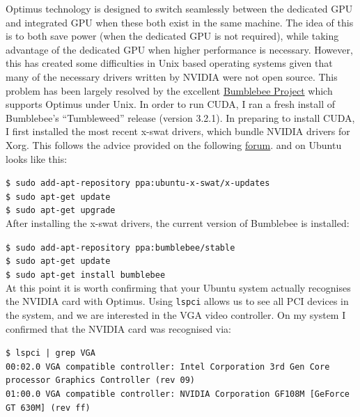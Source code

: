 \documentclass[a4paper,10pt]{article}
\begin{document}
Optimus technology is designed to switch seamlessly between the dedicated GPU
and integrated GPU when these both exist in the same machine.  The idea of this
is to both save power (when the dedicated GPU is not required), while taking
advantage of the dedicated GPU when higher performance is necessary.  However,
this has created some difficulties in Unix based operating systems given that
many of the necessary drivers written by NVIDIA were not open source.  This
problem has been largely resolved by the excellent 
\href{http://bumblebee-project.org/}{Bumblebee Project} which supports Optimus
under Unix.  In order to run CUDA, I ran a fresh install of Bumblebee's 
``Tumbleweed'' release (version 3.2.1).  In preparing to install CUDA, I first
installed the most recent x-swat drivers, which bundle NVIDIA drivers for Xorg.
This follows the advice provided on the following 
\href{http://www.ivegotavirus.com/installing-bumblebee-3-0-tumbleweed-on-ubuntu/}{forum}.
and on Ubuntu looks like this:

\texttt{\$ sudo add-apt-repository ppa:ubuntu-x-swat/x-updates} \\
\indent\texttt{\$ sudo apt-get update} \\
\indent\texttt{\$ sudo apt-get upgrade} \\

After installing the x-swat drivers, the current version of Bumblebee is 
installed:

\texttt{\$ sudo add-apt-repository ppa:bumblebee/stable} \\
\indent\texttt{\$ sudo apt-get update} \\
\indent\texttt{\$ sudo apt-get install bumblebee} \\

At this point it is worth confirming that your Ubuntu system actually 
recognises the NVIDIA card with Optimus.  Using \texttt{lspci} allows us to see
all PCI devices in the system, and we are interested in the VGA video 
controller.  On my system I confirmed that the NVIDIA card was recognised via:

\small
\texttt{\$ lspci | grep VGA} \\
\indent\texttt{00:02.0 VGA compatible controller: Intel Corporation 3rd Gen Core processor Graphics Controller (rev 09)} \\
\indent\texttt{01:00.0 VGA compatible controller: NVIDIA Corporation GF108M [GeForce GT 630M] (rev ff)} \\
\normalsize
\end{document}
